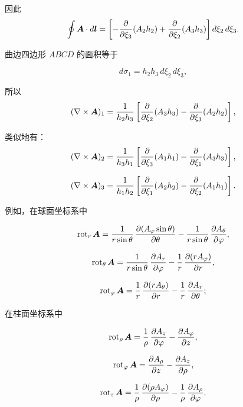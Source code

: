 因此
\begin{equation*}
\oint \bm{A} \cdot d\bm{l} = \left[-\frac{\partial}{\partial\xi_3} (A_2 h_2) + \frac{\partial}{\partial\xi_2} (A_3 h_3)\right] d\xi_2\, d\xi_3.
\end{equation*}

曲边四边形 $ABCD$ 的面积等于

\begin{equation*}
d\sigma_1 = h_2 h_3\, d\xi_2\, d\xi_3,
\end{equation*}

所以
\begin{equation*}
(\nabla \times \bm{A})_1 = \frac{1}{h_2 h_3} \left[ \frac{\partial}{\partial\xi_2} (A_3 h_3) - \frac{\partial}{\partial\xi_3} (A_2 h_2) \right],
\end{equation*}

类似地有：
\begin{equation*}
(\nabla \times \bm{A})_2 = \frac{1}{h_3 h_1} \left[ \frac{\partial}{\partial\xi_3} (A_1 h_1) - \frac{\partial}{\partial\xi_1} (A_3 h_3) \right],
\end{equation*}

\begin{equation*}
(\nabla \times \bm{A})_3 = \frac{1}{h_1 h_2} \left[ \frac{\partial}{\partial\xi_1} (A_2 h_2) - \frac{\partial}{\partial\xi_2} (A_1 h_1) \right].
\end{equation*}

例如，在球面坐标系中

\begin{equation*}
\operatorname{rot}_r \bm{A} = \frac{1}{r\sin\theta}\, \frac{\partial (A_\varphi \sin\theta)}{\partial\theta} - \frac{1}{r\sin\theta}\, \frac{\partial A_\theta}{\partial\varphi},
\end{equation*}

\begin{equation*}
\operatorname{rot}_\theta \bm{A} = \frac{1}{r\sin\theta}\, \frac{\partial A_r}{\partial\varphi} - \frac{1}{r}\, \frac{\partial (r A_\varphi)}{\partial r},
\end{equation*}

\begin{equation*}
\operatorname{rot}_\varphi \bm{A} = \frac{1}{r}\, \frac{\partial (r A_\theta)}{\partial r} - \frac{1}{r}\, \frac{\partial A_r}{\partial\theta};
\end{equation*}

在柱面坐标系中

\begin{equation*}
\operatorname{rot}_\rho \bm{A} = \frac{1}{\rho}\, \frac{\partial A_z}{\partial\varphi} - \frac{\partial A_\varphi}{\partial z},
\end{equation*}

\begin{equation*}
\operatorname{rot}_\varphi \bm{A} = \frac{\partial A_\rho}{\partial z} - \frac{\partial A_z}{\partial\rho},
\end{equation*}

\begin{equation*}
\operatorname{rot}_z \bm{A} = \frac{1}{\rho}\, \frac{\partial (\rho A_\varphi)}{\partial\rho} - \frac{1}{\rho}\, \frac{\partial A_\rho}{\partial\varphi}.
\end{equation*}
